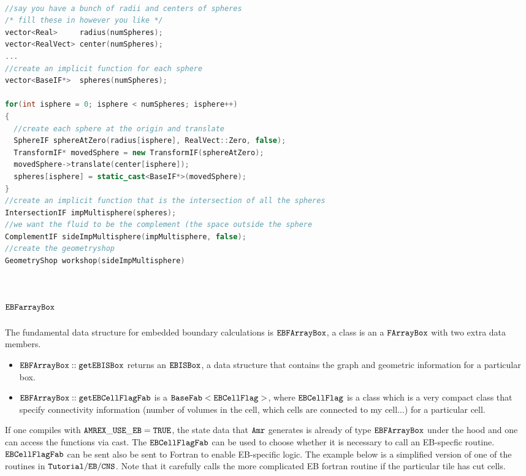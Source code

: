 \begin{lstlisting}[language=cpp]

//say you have a bunch of radii and centers of spheres
/* fill these in however you like */
vector<Real>     radius(numSpheres);
vector<RealVect> center(numSpheres);
...
//create an implicit function for each sphere
vector<BaseIF*>  spheres(numSpheres);

for(int isphere = 0; isphere < numSpheres; isphere++)
{
  //create each sphere at the origin and translate
  SphereIF sphereAtZero(radius[isphere], RealVect::Zero, false);
  TransformIF* movedSphere = new TransformIF(sphereAtZero);
  movedSphere->translate(center[isphere]);
  spheres[isphere] = static_cast<BaseIF*>(movedSphere);
}
//create an implicit function that is the intersection of all the spheres
IntersectionIF impMultisphere(spheres);
//we want the fluid to be the complement (the space outside the sphere
ComplementIF sideImpMultisphere(impMultisphere, false);
//create the geometryshop
GeometryShop workshop(sideImpMultisphere)
\end{lstlisting}


\section{$\tt{EBFarrayBox}$}

The fundamental data structure for embedded boundary calculations is 
$\tt{EBFArrayBox}$, a class is an a $\tt{FArrayBox}$ with two extra
data members.
\begin{itemize}
\item $\tt{EBFArrayBox::getEBISBox}$ returns an $\tt{EBISBox}$, a data
  structure that contains the graph and geometric information for a
  particular box.
\item $\tt{EBFArrayBox::getEBCellFlagFab}$  is a
  $\tt{BaseFab<EBCellFlag>}$, where $\tt{EBCellFlag}$ is a class which
  is a very compact class that specify connectivity information
  (number of volumes in the cell, which cells are connected to my
  cell...) for a particular cell.
\end{itemize}
If one compiles with $\tt{AMREX\_USE\_EB = TRUE}$, the state data that
${\tt Amr}$ generates is already of type $\tt{EBFArrayBox}$ under the
hood and one can access the functions via cast.   The
$\tt{EBCellFlagFab}$ can be used to choose whether it is necessary to call an
EB-specfic routine. $\tt{EBCellFlagFab}$  can be sent also be sent to Fortran to 
enable EB-specific logic.   The example below is a simplified version
of one of the routines in $\tt{Tutorial/EB/CNS}$.   Note  that  it
carefully calls the more complicated EB fortran routine if the
particular tile has cut cells.

